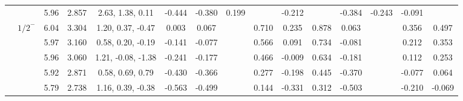 \documentclass[prd,twocolumn,floatfix,nofootinbib]{revtex4}
\begin{document}
\begin{table*}[!htbp]
\begin{tabular}{cc|ccc|cccccccccc}
            &               &5.96   &2.857  &2.63, 1.38, 0.11 &-0.444 &-0.380 &0.199 & &-0.212 & &-0.384 &-0.243 &-0.091 & \\
            &${1/2}^{-}$    &6.04   &3.304  &1.20, 0.37, -0.47 &0.003 &0.067 & &0.710 &0.235 &0.878 &0.063 & &0.356 &0.497 \\
            &               &5.97   &3.160  &0.58, 0.20, -0.19 &-0.141 &-0.077 & &0.566 &0.091 &0.734 &-0.081 & &0.212 &0.353 \\
            &               &5.96   &3.060  &1.21, -0.08, -1.38 &-0.241 &-0.177 & &0.466 &-0.009 &0.634 &-0.181 & &0.112 &0.253 \\
            &               &5.92   &2.871  &0.58, 0.69, 0.79 &-0.430 &-0.366 & &0.277 &-0.198 &0.445 &-0.370 & &-0.077 &0.064 \\
            &               &5.79   &2.738  &1.16, 0.39, -0.38 &-0.563 &-0.499 & &0.144 &-0.331 &0.312 &-0.503 & &-0.210 &-0.069 \\
        \bottomrule[0.5pt]\bottomrule[1.5pt]
    \end{tabular}
\end{table*}
\end{document}
